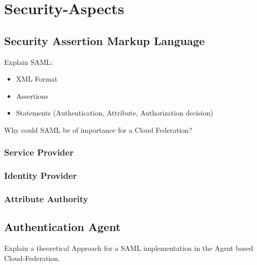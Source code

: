\chapter{Security-Aspects}

\section{Security Assertion Markup Language}
Explain SAML:
\begin{itemize}
 \item XML Format
 \item Assertions
 \item Statements (Authentication, Attribute, Authorization decision)
\end{itemize}
Why could SAML be of importance for a Cloud Federation?

\subsection{Service Provider}

\subsection{Identity Provider}

\subsection{Attribute Authority}



\section{Authentication Agent}
Explain a theoretical Approach for a SAML implementation in the Agent based Cloud-Federation.
